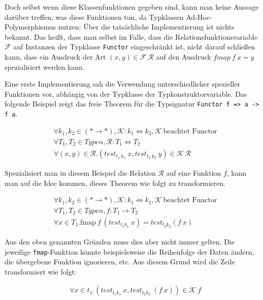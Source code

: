 Doch selbst wenn diese Klassenfunktionen gegeben sind, kann man keine Aussage darüber treffen, was diese Funktionen tun, da
Typklassen Ad-Hoc-Polymorphismus nutzen: Über die tatsächliche Implementierung ist nichts bekannt. Das heißt, dass man selbst im Falle, dass
die Relationsfunktionsvariable $\mathcal{F}$ auf Instanzen der Typklasse \texttt{Functor} eingeschränkt ist, nicht darauf schließen kann, dass ein Ausdruck der Art $(x, y) \in \mathcal{F}\ \mathcal{R}$ auf den Ausdruck
$fmap\ f\ x = y$ spezialisiert werden kann.

Eine erste Implementierung sah die Verwendung unterschiedlicher spezieller Funktionen vor, abhängig von der Typklasse der
Typkonstruktorvariable. Das folgende Beispiel zeigt das freie Theorem für die Typsignatur \texttt{Functor f => a -> f a}.

\begin{align*}
& \forall k_1, k_2 \in (* \rightarrow *), \mathcal{K} : k_1 \Leftrightarrow k_2, \mathcal{K}\ \text{beachtet Functor} \\
& \forall T_1, T_2 \in Typen, \mathcal{R} : T_1 \Leftrightarrow T_2 \\
& \forall (x, y) \in \mathcal{R} . (test_{t_1\ k_1}\ x, test_{t_2\ k_2}\ y) \in \mathcal{K}\ \mathcal{R}
\end{align*}

Spezialisiert man in diesem Beispiel die Relation $\mathcal{R}$ auf eine Funktion $f$, kann man auf die Idee kommen, dieses Theorem
wie folgt zu transformieren.

\begin{align*}
& \forall k_1, k_2 \in (* \rightarrow *), \mathcal{K} : k_1 \Leftrightarrow k_2, \mathcal{K}\ \text{beachtet Functor} \\
& \forall T_1, T_2 \in Typen, f : T_1 \rightarrow T_2 \\
& \forall x \in T_1 . \text{fmap}\ f\ (test_{t_1 k_1}\ x) = test_{t_2 k_2} (f\ x)
\end{align*}

Aus den oben genannten Gründen muss dies aber nicht immer gelten. Die jeweilige \texttt{fmap}-Funktion könnte beispielsweise
die Reihenfolge der Daten ändern, die übergebene Funktion ignorieren, etc.
Aus diesem Grund wird die Zeile transformiert wie folgt:

\begin{align*}
& \forall x \in t_1 . (test_{t_1 k_1}\ x, test_{t_2 k_2}\ (f\ x)) \in \mathcal{K}\ f
\end{align*}

